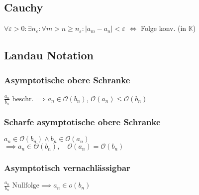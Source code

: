 \subsection*{Cauchy}
$\forall \varepsilon>0: \exists n_\varepsilon: \forall m>n \ge n_\varepsilon: |a_m - a_n| < \varepsilon$
$\iff$ Folge konv. (in $\mathbb{K}$)

\subsection*{Landau Notation}

\subsubsection*{Asymptotische obere Schranke}
$\frac{a_n}{b_n} \text{ beschr.} \implies a_n \in\mathcal{O}(b_n)$, $\mathcal{O}(a_n)\le\mathcal{O}(b_n)$

\subsubsection*{Scharfe asymptotische obere Schranke}
$a_n \in \mathcal{O}(b_n) \land b_n \in \mathcal{O}(a_n)$\\
$\implies a_n \in \Theta(b_n),\quad\mathcal{O}(a_n)=\mathcal{O}(b_n)$

\subsubsection*{Asymptotisch vernachlässigbar}
$\frac{a_n}{b_n} \text{ Nullfolge} \implies a_n \in o(b_n)$
